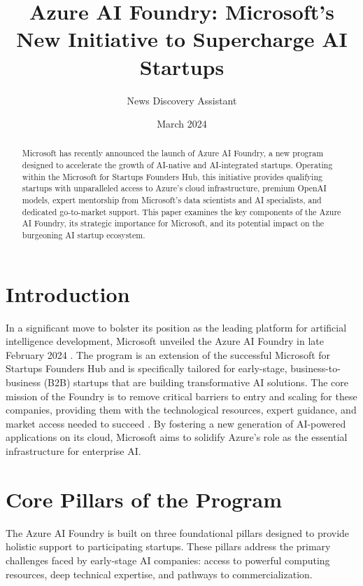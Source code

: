\documentclass[11pt, a4paper]{article}
\title{Azure AI Foundry: Microsoft's New Initiative to Supercharge AI Startups}
\author{News Discovery Assistant}
\date{March 2024}
\begin{document}
\maketitle

\begin{abstract}
Microsoft has recently announced the launch of Azure AI Foundry, a new program designed to accelerate the growth of AI-native and AI-integrated startups. Operating within the Microsoft for Startups Founders Hub, this initiative provides qualifying startups with unparalleled access to Azure's cloud infrastructure, premium OpenAI models, expert mentorship from Microsoft's data scientists and AI specialists, and dedicated go-to-market support. This paper examines the key components of the Azure AI Foundry, its strategic importance for Microsoft, and its potential impact on the burgeoning AI startup ecosystem.
\end{abstract}

\section{Introduction}
In a significant move to bolster its position as the leading platform for artificial intelligence development, Microsoft unveiled the Azure AI Foundry in late February 2024 \cite{microsoft_blog}. The program is an extension of the successful Microsoft for Startups Founders Hub and is specifically tailored for early-stage, business-to-business (B2B) startups that are building transformative AI solutions. The core mission of the Foundry is to remove critical barriers to entry and scaling for these companies, providing them with the technological resources, expert guidance, and market access needed to succeed \cite{techcrunch}. By fostering a new generation of AI-powered applications on its cloud, Microsoft aims to solidify Azure's role as the essential infrastructure for enterprise AI.

\section{Core Pillars of the Program}
The Azure AI Foundry is built on three foundational pillars designed to provide holistic support to participating startups. These pillars address the primary challenges faced by early-stage AI companies: access to powerful computing resources, deep technical expertise, and pathways to commercialization.
\end{document}
